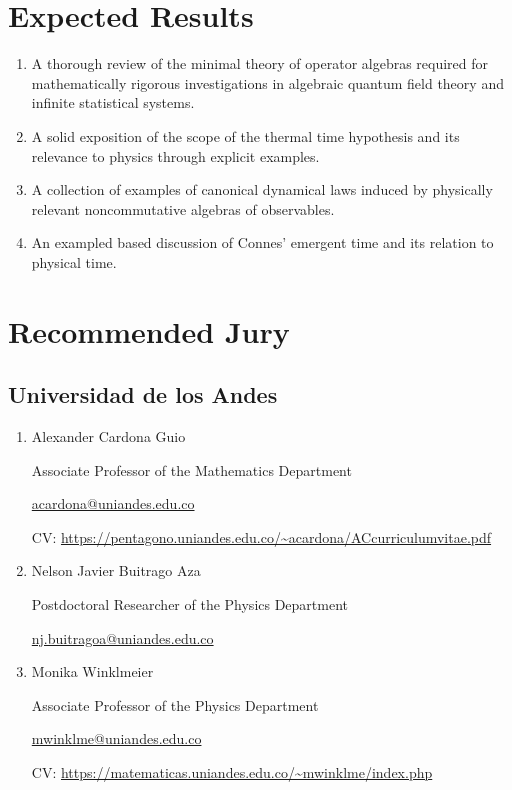 \documentclass{article}
\begin{document}
\section{Expected Results}

\begin{enumerate}
\item A thorough review of the minimal theory of operator algebras required for mathematically rigorous investigations in algebraic quantum field theory and infinite statistical systems.
\item A solid exposition of the scope of the thermal time hypothesis and its relevance to physics through explicit examples.
\item A collection of examples of canonical dynamical laws induced by physically relevant noncommutative algebras of observables.
\item An exampled based discussion of Connes' emergent time and its relation to physical time.
\end{enumerate}

\section*{Recommended Jury}

\subsection*{Universidad de los Andes}

\begin{enumerate}

\item Alexander Cardona Guio

Associate Professor of the Mathematics Department

\href{mailto:acardona@uniandes.edu.co}{acardona@uniandes.edu.co}

CV: \url{https://pentagono.uniandes.edu.co/~acardona/ACcurriculumvitae.pdf}

\item Nelson Javier Buitrago Aza

Postdoctoral Researcher of the Physics Department

\href{mailto:nj.buitragoa@uniandes.edu.co}{nj.buitragoa@uniandes.edu.co}

\item Monika Winklmeier

Associate Professor of the Physics Department

\href{mailto:mwinklme@uniandes.edu.co}{mwinklme@uniandes.edu.co}

CV: \url{https://matematicas.uniandes.edu.co/~mwinklme/index.php} 

\end{enumerate}
\end{document}
